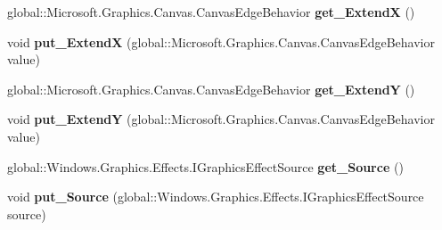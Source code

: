 \begin{DoxyCompactItemize}
\item 
\mbox{\label{interface_microsoft_1_1_graphics_1_1_canvas_1_1_effects_1_1_i_border_effect_a3ffc4033dcf6efc380e3123b9b5c0705}} 
global\+::\+Microsoft.\+Graphics.\+Canvas.\+Canvas\+Edge\+Behavior {\bfseries get\+\_\+\+ExtendX} ()
\item 
\mbox{\label{interface_microsoft_1_1_graphics_1_1_canvas_1_1_effects_1_1_i_border_effect_a3d2ad4061338958f9b6396932807d34e}} 
void {\bfseries put\+\_\+\+ExtendX} (global\+::\+Microsoft.\+Graphics.\+Canvas.\+Canvas\+Edge\+Behavior value)
\item 
\mbox{\label{interface_microsoft_1_1_graphics_1_1_canvas_1_1_effects_1_1_i_border_effect_a7a0f2391a20f1cfa52255948727851d6}} 
global\+::\+Microsoft.\+Graphics.\+Canvas.\+Canvas\+Edge\+Behavior {\bfseries get\+\_\+\+ExtendY} ()
\item 
\mbox{\label{interface_microsoft_1_1_graphics_1_1_canvas_1_1_effects_1_1_i_border_effect_a372972f65ae9a42601613acb61241a6d}} 
void {\bfseries put\+\_\+\+ExtendY} (global\+::\+Microsoft.\+Graphics.\+Canvas.\+Canvas\+Edge\+Behavior value)
\item 
\mbox{\label{interface_microsoft_1_1_graphics_1_1_canvas_1_1_effects_1_1_i_border_effect_a2455f124b6e073f2b70aa6c68d5bc616}} 
global\+::\+Windows.\+Graphics.\+Effects.\+I\+Graphics\+Effect\+Source {\bfseries get\+\_\+\+Source} ()
\item 
\mbox{\label{interface_microsoft_1_1_graphics_1_1_canvas_1_1_effects_1_1_i_border_effect_a7d1e465d73b86e93f93e8df97f29f492}} 
void {\bfseries put\+\_\+\+Source} (global\+::\+Windows.\+Graphics.\+Effects.\+I\+Graphics\+Effect\+Source source)
\item 
\mbox{\label{interface_microsoft_1_1_graphics_1_1_canvas_1_1_effects_1_1_i_border_effect_a3ffc4033dcf6efc380e3123b9b5c0705}} 

\end{DoxyCompactItemize}
